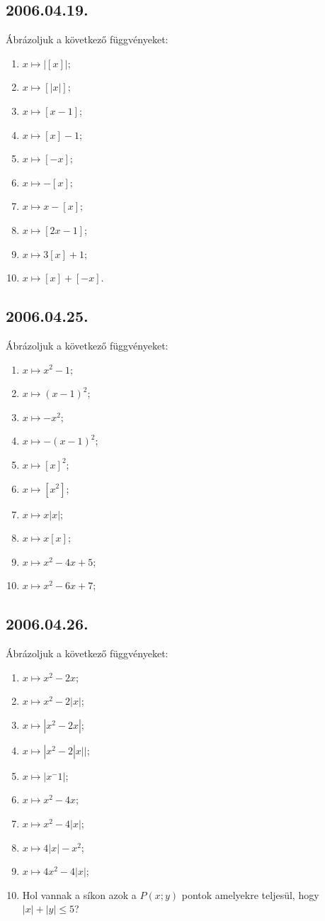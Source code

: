 \subsection*{2006.04.19.}
Ábrázoljuk a következő függvényeket:
\begin{enumerate}
\item $x \mapsto |[x]|$;
\item $x \mapsto [|x|]$;
\item $x \mapsto [x-1]$;
\item $x \mapsto [x]-1$;
\item $x \mapsto [-x]$;
\item $x \mapsto -[x]$;
\item $x \mapsto x-[x]$;
\item $x \mapsto [2x-1]$;
\item $x \mapsto 3[x]+1$;
\item $x \mapsto [x]+[-x]$.
\end{enumerate}

\subsection*{2006.04.25.}
Ábrázoljuk a következő függvényeket:
\begin{enumerate}
\item $x \mapsto x^2-1$;
\item $x \mapsto (x-1)^2$;
\item $x \mapsto -x^2$;
\item $x \mapsto -(x-1)^2$;
\item $x \mapsto [x]^2$;
\item $x \mapsto [x^2]$;
\item $x \mapsto x|x|$;
\item $x \mapsto x[x]$;
\item $x \mapsto x^2-4x+5$;
\item $x \mapsto x^2-6x+7$;
\end{enumerate}

\subsection*{2006.04.26.}
Ábrázoljuk a következő függvényeket:
\begin{enumerate}
\item $x \mapsto x^2-2x$;
\item $x \mapsto x^2-2|x|$;
\item $x \mapsto |x^2-2x|$;
\item $x \mapsto |x^2-2|x||$;
\item $x \mapsto |x^-1|$;
\item $x \mapsto x^2-4x$;
\item $x \mapsto x^2-4|x|$;
\item $x \mapsto 4|x|-x^2$;
\item $x \mapsto 4x^2-4|x|$;
\item Hol vannak a síkon azok a $P(x;y)$ pontok amelyekre teljesül, hogy $|x|+|y|\le5$?
\end{enumerate}


